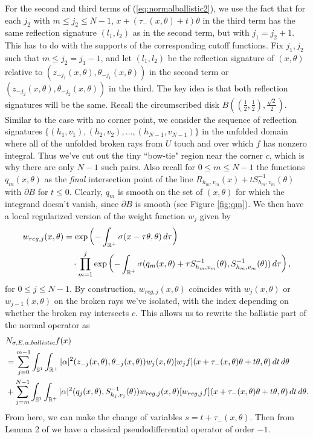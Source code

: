 \documentclass[10pt]{amsart}
\theoremstyle{definition}
\theoremstyle{definition}
\theoremstyle{definition}
\newcommand{ \rn }[1]{\mathbb{R}^{#1}}
\begin{document}
For the second and third terms of (\ref{eq:normalballistic2}), we use the fact that for each $j_{2}$ with $m \leq j_{2} \leq N-1$, $x+(\tau_{-}(x,\theta)+t)\theta$ in the third term has the same reflection signature $(l_{1},l_{2})$ as in the second term, but with $j_{1} = j_{2} + 1$. This has to do with the supports of the corresponding cutoff functions. Fix $j_{1},j_{2}$ such that $m \leq j_{2} = j_{1}-1$, and let $(l_{1},l_{2})$ be the reflection signature of $(x,\theta)$ relative to $(z_{-j_{1}}(x,\theta), \theta_{-j_{1}}(x,\theta))$ in the second term or $(z_{-j_{2}}(x,\theta), \theta_{-j_{2}}(x,\theta))$ in the third. The key idea is that both reflection signatures will be the same. Recall the circumscribed disk $B((\frac{1}{2},\frac{1}{2}), \frac{\sqrt{2}}{2})$. Similar to the case with no corner point, we consider the sequence of reflection signatures $\{(h_{1},v_{1}), (h_{2},v_{2}), \ldots, (h_{N-1}, v_{N-1}) \}$ in the unfolded domain where all of the unfolded broken rays from $U$ touch and over which $f$ has nonzero integral. Thus we've cut out the tiny ``bow-tie" region near the corner $c$, which is why there are only $N-1$ such pairs. Also recall for $0 \leq m \leq N-1$ the functions $q_{m}(x,\theta)$ as the \textit{final} intersection point of the line $R_{h_{m},v_{m}}(x) + tS_{h_{m},v_{m}}^{-1}(\theta)$ with $\partial B$ for $t \leq 0$. Clearly, $q_{m}$ is smooth on the set of $(x,\theta)$ for which the integrand doesn't vanish, since $\partial B$ is smooth (see Figure \ref{fig:qm}). We then have a local regularized version of the weight function $w_{j}$ given by
\begin{align}
w_{reg,j}(x,\theta) & = \exp\left( -\int_{\rn{+}}\sigma(x-\tau\theta, \theta)\,d\tau \right) \notag\\
& \quad  \cdot \prod_{m=1}^{j}\exp\left( -\int_{\rn{+}}\sigma(q_{m}(x,\theta) + \tau S_{h_{m}, v_{m}}^{-1}(\theta), S_{h_{m}, v_{m}}^{-1}(\theta))\,d\tau \right),
\end{align}
for $0 \leq j \leq N-1$. By construction, $w_{reg,j}(x,\theta)$ coincides with $w_{j}(x,\theta)$ or $w_{j-1}(x,\theta)$ on the broken rays we've isolated, with the index depending on whether the broken ray intersects $c$. This allows us to rewrite the ballistic part of the normal operator as
\begin{align*}
& N_{\sigma, E, \alpha, ballistic}f(x) \\
& = \sum_{j=0}^{m-1}\int_{\mathbb{S}^{1}}\int_{\rn{+}}|\alpha|^{2}(z_{-j}(x,\theta),\theta_{-j}(x,\theta))w_{j}(x,\theta)  [w_{j}f](x + \tau_{-}(x,\theta)\theta+ t\theta, \theta)\, dt \,d\theta \notag\\
& + \sum_{j=m}^{N-1}\int_{\mathbb{S}^{1}}\int_{\rn{+}}|\alpha|^{2}(q_{j}(x,\theta), S_{h_{j}, v_{j}}^{-1}(\theta))w_{reg,j}(x,\theta) [w_{reg,j}f](x + \tau_{-}(x,\theta)\theta+ t\theta, \theta)\, dt \,d\theta \notag.
\end{align*}
From here, we can make the change of variables $s = t + \tau_{-}(x,\theta)$. Then from Lemma 2 of \cite{xraygeneric} we have a classical pseudodifferential operator of order $-1$.
\end{document}
